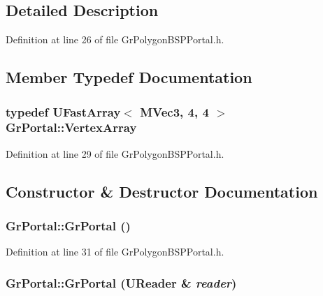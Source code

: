 \subsection{Detailed Description}


Definition at line 26 of file GrPolygonBSPPortal.h.

\subsection{Member Typedef Documentation}
\hypertarget{class_gr_portal_3725398b99bf9b73fda499ac8d3218c8}{
\subsubsection[{VertexArray}]{\setlength{\rightskip}{0pt plus 5cm}typedef {\bf UFastArray}$<$ {\bf MVec3}, 4, 4 $>$ {\bf GrPortal::VertexArray}}}
\label{class_gr_portal_3725398b99bf9b73fda499ac8d3218c8}




Definition at line 29 of file GrPolygonBSPPortal.h.

\subsection{Constructor \& Destructor Documentation}
\hypertarget{class_gr_portal_6b1f01d3fa0e30c96933e25f8e9b0d9d}{
\subsubsection[{GrPortal}]{\setlength{\rightskip}{0pt plus 5cm}GrPortal::GrPortal ()}}
\label{class_gr_portal_6b1f01d3fa0e30c96933e25f8e9b0d9d}




Definition at line 31 of file GrPolygonBSPPortal.h.\hypertarget{class_gr_portal_7c26e2e46f6d439cc1f3ec29ca342fdc}{
\subsubsection[{GrPortal}]{\setlength{\rightskip}{0pt plus 5cm}GrPortal::GrPortal ({\bf UReader} \& {\em reader})}}
\label{class_gr_portal_7c26e2e46f6d439cc1f3ec29ca342fdc}




